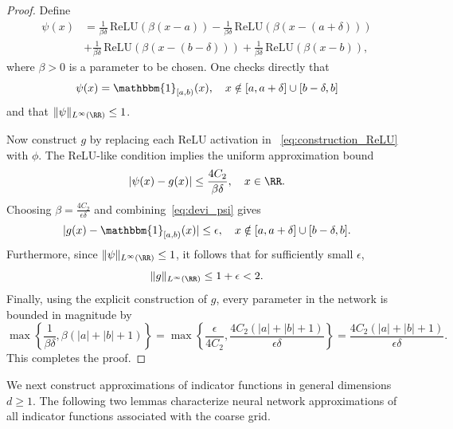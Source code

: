\documentclass[11pt]{article}
\begin{document}
\begin{proof}
    Define 
    \begin{equation}
        \begin{aligned}
            \psi(x) & = \frac{1}{\beta \delta} \, \mathrm{ReLU}(\beta(x-a)) - \frac{1}{\beta \delta}  \, \mathrm{ReLU} (\beta (x - (a+ \delta))) \\
            & + \frac{1}{\beta \delta}  \,\mathrm{ReLU}(\beta (x - (b - \delta))) + \frac{1}{ \beta \delta}  \, \mathrm{ReLU} (\beta (x - b)), 
        \end{aligned}
        \label{eq:construction_ReLU}
    \end{equation}
    where $\beta >0$ is a parameter to be chosen. One checks directly that
    \begin{equation}
        \psi(x) = \mathbbm{1}_{[a,b)} (x) ,\quad  x \notin [a,a+\delta] \cup [b-\delta,b]
        \label{eq:devi_psi}
    \end{equation}
    and that $\|\psi\|_{L^{\infty}(\RR)} \leq 1$. 
    

    Now construct $g$ by replacing each ReLU activation in ~\eqref{eq:construction_ReLU} with $\phi$. The ReLU-like condition implies the uniform approximation bound
    \begin{equation*}
       |\psi(x) - g(x)| \leq \frac{4 C_2 }{\beta \delta}, \quad x \in \RR.
    \end{equation*}
    Choosing $\beta = \frac{4 C_2}{\epsilon \delta}$ and combining~\eqref{eq:devi_psi} gives 
    \begin{equation*}
        |g(x) - \mathbbm{1}_{[a,b)}(x)| \leq \epsilon, \quad  x \notin [a,a+\delta] \cup [b-\delta,b].
    \end{equation*}
    Furthermore, since $\|\psi\|_{L^{\infty}(\RR)} \leq 1$, it follows that for sufficiently small $\epsilon$, 
    \begin{equation*}
        \|g\|_{L^{\infty}(\RR)} \leq 1 + \epsilon < 2  .
    \end{equation*}
    Finally, using the explicit construction of $g$, every parameter in the network is bounded in magnitude by
    \begin{equation*}
        \max \left\{  \frac{1}{\beta \delta},  \beta (|a| + |b| + 1)\right\} = \max \left\{ \frac{\epsilon}{4 C_2} , \frac{4C_2 (|a| + |b| +1)}{\epsilon \delta}\right\} = \frac{4C_2 (|a|+ |b|+1)}{\epsilon \delta}.
    \end{equation*}
    This completes the proof.
\end{proof}
We next construct approximations of indicator functions in general dimensions $d \geq 1$. The following two lemmas characterize neural network approximations of all indicator functions associated with the coarse grid.
\end{document}
